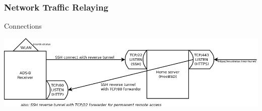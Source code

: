\begin{frame}
\frametitle{Network Traffic Relaying}
\begin{block}{Connections}



\includegraphics[height=0.3\textheight]{image/adsb-networking.png}

\end{block}
\end{frame}
